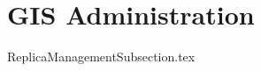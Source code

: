 \documentclass{book}
\title{}  %
\begin{document}
\ifstandalone
\maketitle %
\clearpage
\tableofcontents %
\clearpage
\fi


% 
\section{GIS Administration}

{ReplicaManagementSubsection.tex}
\end{document}
